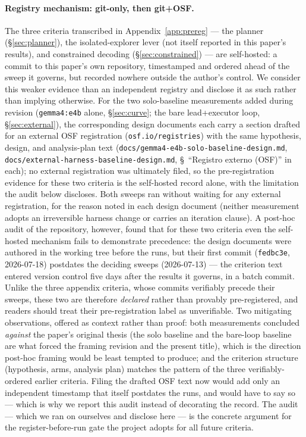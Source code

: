 \documentclass[smallcondensed,natbib]{svjour3}
\begin{document}
\paragraph{Registry mechanism: git-only, then git+OSF.} The three
criteria transcribed in Appendix~\ref{app:prereg} --- the planner
(\S\ref{sec:planner}), the isolated-explorer lever (not itself reported
in this paper's results), and constrained decoding
(\S\ref{sec:constrained}) --- are self-hosted: a commit to this paper's
own repository, timestamped and ordered ahead of the sweep it governs,
but recorded nowhere outside the author's control. We consider this
weaker evidence than an independent registry and disclose it as such
rather than implying otherwise. For the two solo-baseline
measurements added during revision (\texttt{gemma4:e4b} alone,
\S\ref{sec:curve}; the bare lead+executor loop,
\S\ref{sec:external}), the corresponding design documents each carry a
section drafted for an external OSF registration
(\texttt{osf.io/registries}) with the same hypothesis, design, and
analysis-plan text (\texttt{docs/gemma4-e4b-solo-baseline-design.md},
\texttt{docs/external-harness-baseline-design.md}, \S~``Registro
externo (OSF)'' in each); no external registration was ultimately
filed, so the pre-registration evidence for these two criteria is the
self-hosted record alone, with the limitation the audit below
discloses. Both sweeps ran without waiting for any external
registration, for the reason noted in each design
document (neither measurement adopts an irreversible harness change or
carries an iteration clause). A post-hoc audit of the repository,
however, found that for these two criteria even the self-hosted
mechanism fails to demonstrate precedence: the design documents were
authored in the working tree before the runs, but their first commit
(\texttt{fedbc3e}, 2026-07-18) postdates the deciding sweeps
(2026-07-13) --- the criterion text entered version control five days
after the results it governs, in a batch commit. Unlike the three
appendix criteria, whose commits verifiably precede their sweeps, these
two are therefore \emph{declared} rather than provably pre-registered,
and readers should treat their pre-registration label as unverifiable.
Two mitigating observations, offered as context rather than proof: both
measurements concluded \emph{against} the paper's original thesis (the
solo baseline and the bare-loop baseline are what forced the
framing revision and the present title), which is the direction
post-hoc framing would be least tempted to produce; and the criterion
structure (hypothesis, arms, analysis plan) matches the pattern of the
three verifiably-ordered earlier criteria. Filing the drafted OSF text
now would add only an independent timestamp that itself postdates the
runs, and would have to say so --- which is why we report this audit
instead of decorating the record. The audit --- which we
ran on ourselves and disclose here --- is the concrete argument for the
register-before-run gate the project adopts for all future criteria.
\end{document}
